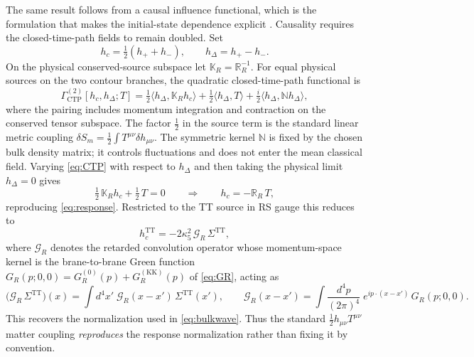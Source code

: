 \documentclass[11pt,a4paper]{article}
\theoremstyle{plain}
\theoremstyle{definition}
\newcommand{\kfive}{\kappa_5}
\newcommand{\TT}{\mathrm{TT}}
\newcommand{\KK}{\mathrm{KK}}
\begin{document}
The same result follows from a causal influence functional, which is the
formulation that makes the initial-state dependence explicit
\cite{FeynmanVernon}. Causality requires the closed-time-path fields to
remain doubled. Set
\begin{equation}
\label{eq:keldysh}
h_c=\tfrac12(h_++h_-),
\qquad
h_\Delta=h_+-h_- .
\end{equation}
On the physical conserved-source subspace let
$\mathbb K_R=\mathbb R_R^{-1}$. For equal physical sources on the two
contour branches, the quadratic closed-time-path functional is
\begin{equation}
\label{eq:CTP}
\boxed{\;
\Gamma^{(2)}_{\mathrm{CTP}}[h_c,h_\Delta;T]
=\tfrac12\bigl\langle h_\Delta,\mathbb K_R h_c\bigr\rangle
+\tfrac12\bigl\langle h_\Delta,T\bigr\rangle
+\tfrac{i}{2}\bigl\langle h_\Delta,\mathbb N h_\Delta\bigr\rangle ,
\;}
\end{equation}
where the pairing includes momentum integration and contraction on the
conserved tensor subspace. The factor $\tfrac12$ in the source term is
the standard linear metric coupling
$\delta S_m=\tfrac12\int T^{\mu\nu}\delta h_{\mu\nu}$. The symmetric
kernel $\mathbb N$ is fixed by the chosen bulk density matrix; it
controls fluctuations and does not enter the mean classical field.
Varying \eqref{eq:CTP} with respect to $h_\Delta$ and then taking the
physical limit $h_\Delta=0$ gives
\begin{equation}
\label{eq:ctpEOM}
\tfrac12\,\mathbb K_R h_c+\tfrac12\,T=0
\qquad\Longrightarrow\qquad
h_c=-\mathbb R_R\,T ,
\end{equation}
reproducing \eqref{eq:response}. Restricted to the TT source in RS gauge
this reduces to
\begin{equation}
\label{eq:TTresponse}
h_c^{\TT}=-2\kfive^2\,\mathcal G_R\,\Sigma^{\TT},
\end{equation}
where $\mathcal G_R$ denotes the retarded convolution operator whose
momentum-space kernel is the brane-to-brane Green function
$G_R(p;0,0)=G_R^{(0)}(p)+G_R^{(\KK)}(p)$ of \eqref{eq:GR}, acting as
\begin{equation}
\label{eq:GRop}
\bigl(\mathcal G_R\,\Sigma^{\TT}\bigr)(x)
=\int d^4x'\;\mathcal G_R(x-x')\,\Sigma^{\TT}(x'),
\qquad
\mathcal G_R(x-x')
=\int\frac{d^4p}{(2\pi)^4}\;e^{ip\cdot(x-x')}\,G_R(p;0,0).
\end{equation}
This recovers the normalization used in \eqref{eq:bulkwave}. Thus the
standard $\tfrac12 h_{\mu\nu}T^{\mu\nu}$ matter coupling \emph{reproduces}
the response normalization rather than fixing it by convention.
\end{document}
